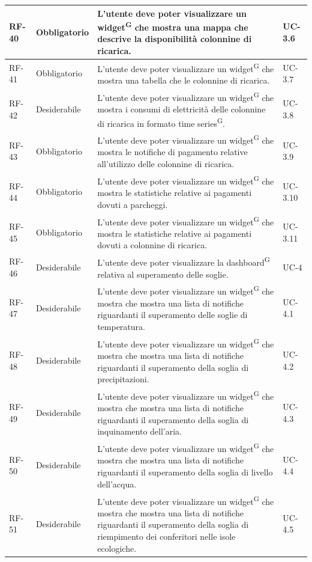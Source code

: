 \documentclass[8pt]{article}
\newcommand{\glossterm}[1]{#1\textsuperscript{G}} %
\begin{document}
\begin{longtable}{|>{\centering\arraybackslash}p{1.2cm}|>{\centering\arraybackslash}p{2cm}|>{\centering\arraybackslash}p{8.5cm}|>{\centering\arraybackslash}p{3cm}|}
            RF-40 & Obbligatorio & L'utente deve poter visualizzare un \glossterm{widget} che mostra una mappa che descrive la disponibilità colonnine di ricarica. & UC-3.6 \\ \hline
            RF-41 & Obbligatorio & L'utente deve poter visualizzare un \glossterm{widget} che mostra una tabella che le colonnine di ricarica. & UC-3.7 \\ \hline
            RF-42 & Desiderabile & L'utente deve poter visualizzare un \glossterm{widget} che mostra i consumi di elettricità delle colonnine di ricarica in formato \glossterm{time series}. & UC-3.8 \\ \hline
            RF-43 & Obbligatorio & L'utente deve poter visualizzare un \glossterm{widget} che mostra le notifiche di pagamento relative all'utilizzo delle colonnine di ricarica. & UC-3.9 \\ \hline
            RF-44 & Obbligatorio & L'utente deve poter visualizzare un \glossterm{widget} che mostra le statistiche relative ai pagamenti dovuti a parcheggi. & UC-3.10 \\ \hline
            RF-45 & Obbligatorio & L'utente deve poter visualizzare un \glossterm{widget} che mostra le statistiche relative ai pagamenti dovuti a colonnine di ricarica. & UC-3.11 \\ \hline
            RF-46 & Desiderabile & L'utente deve poter visualizzare la \glossterm{dashboard} relativa al superamento delle soglie. & UC-4 \\ \hline
            RF-47 & Desiderabile & L'utente deve poter visualizzare un \glossterm{widget} che mostra che mostra una lista di notifiche riguardanti il superamento delle soglie di temperatura. & UC-4.1 \\ \hline
            RF-48 & Desiderabile & L'utente deve poter visualizzare un \glossterm{widget} che mostra che mostra una lista di notifiche riguardanti il superamento della soglia di precipitazioni. & UC-4.2 \\ \hline
            RF-49 & Desiderabile & L'utente deve poter visualizzare un \glossterm{widget} che mostra che mostra una lista di notifiche riguardanti il superamento della soglia di inquinamento dell'aria. & UC-4.3 \\ \hline
            RF-50 & Desiderabile & L'utente deve poter visualizzare un \glossterm{widget} che mostra che mostra una lista di notifiche riguardanti il superamento della soglia di livello dell'acqua. & UC-4.4 \\ \hline
            RF-51 & Desiderabile & L'utente deve poter visualizzare un \glossterm{widget} che mostra che mostra una lista di notifiche riguardanti il superamento della soglia di riempimento dei conferitori nelle isole ecologiche. & UC-4.5 \\ \hline

\end{longtable}
\end{document}
